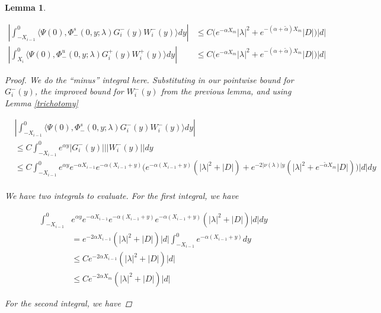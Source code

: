 \documentclass[12pt]{article}
\newtheorem{lemma}{Lemma}
\begin{document}
\begin{lemma}\label{noncenterW}

\begin{align*}
\left| \int_{-X_{i-1}}^0 \langle \Psi(0), \Phi^s_-(0, y; \lambda) G_i^-(y) W_i^-(y) \rangle dy \right| &\leq C \Big( e^{-\alpha X_m} |\lambda|^2 + e^{-(\alpha + \tilde{\alpha}) X_m} |D| \Big) |d| \\
\left| \int_{X_i}^0 \langle \Psi(0), \Phi^u_-(0, y; \lambda) G_i^+(y) W_i^+(y) \rangle dy \right| &\leq C \Big( e^{-\alpha X_m} |\lambda|^2 + e^{-(\alpha + \tilde{\alpha}) X_m} |D| \Big) |d|
\end{align*}

\begin{proof}

We do the ``minus'' integral here. Substituting in our pointwise bound for $G_i^-(y)$, the improved bound for $W_i^-(y)$ from the previous lemma, and using Lemma \ref{trichotomy}

\begin{align*}
&\left| \int_{-X_{i-1}}^0 \langle \Psi(0), \Phi^s_-(0, y; \lambda) G_i^-(y) W_i^-(y) \rangle dy \right| \\
&\leq C \int_{-X_{i-1}}^0 e^{\alpha y} |G_i^-(y)| ||W_i^-(y)|| dy \\
&\leq C \int_{-X_{i-1}}^0 e^{\alpha y} e^{-\alpha X_{i-1}} e^{-\alpha(X_{i-1} + y)} \Big(e^{-\alpha(X_{i-1} + y)}( |\lambda|^2 + |D|)
+ e^{-2|\nu(\lambda)|y}( |\lambda|^2 + e^{-\tilde{\alpha} X_m}|D|) \Big) |d| dy \\
\end{align*}

We have two integrals to evaluate. For the first integral, we have

\begin{align*}
\int_{-X_{i-1}}^0 &e^{\alpha y} e^{-\alpha X_{i-1}} e^{-\alpha(X_{i-1} + y)} e^{-\alpha(X_{i-1} + y)}( |\lambda|^2 + |D|) |d| dy \\
&= e^{-2 \alpha X_{i-1}} ( |\lambda|^2 + |D|) |d| \int_{-X_{i-1}}^0 e^{-\alpha(X_{i-1} + y)} dy \\
&\leq C e^{-2 \alpha X_{i-1}} ( |\lambda|^2 + |D|) |d| \\
&\leq C e^{-2 \alpha X_m}( |\lambda|^2 + |D|) |d|
\end{align*}

For the second integral, we have


\end{proof}
\end{lemma}
\end{document}
